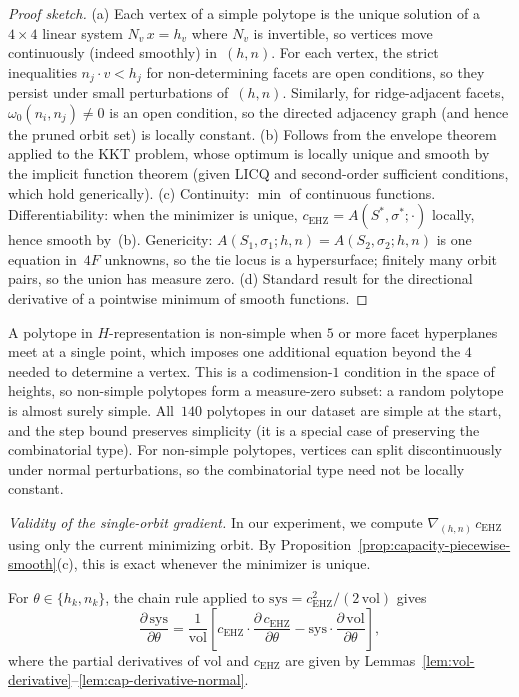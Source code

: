 \begin{proof}[Proof sketch]
(a) Each vertex of a simple polytope is the unique solution of a $4 \times 4$
linear system $N_v\,x = h_v$ where $N_v$ is invertible, so vertices move
continuously (indeed smoothly) in~$(h,n)$.
For each vertex, the strict inequalities
$n_j \cdot v < h_j$ for non-determining facets are open conditions, so they
persist under small perturbations of~$(h,n)$.
Similarly, for ridge-adjacent facets, $\omega_0(n_i, n_j) \neq 0$ is an open
condition, so the directed adjacency graph (and hence the pruned orbit set)
is locally constant.
(b) Follows from the envelope theorem applied to the KKT problem, whose
optimum is locally unique and smooth by the implicit function theorem
(given LICQ and second-order sufficient conditions, which hold generically).
(c) Continuity: $\min$ of continuous functions.
Differentiability: when the minimizer is unique, $c_{\mathrm{EHZ}} =
A(S^*,\sigma^*;\cdot)$ locally, hence smooth by~(b).
Genericity: $A(S_1,\sigma_1;h,n) = A(S_2,\sigma_2;h,n)$ is one equation in~$4F$
unknowns, so the tie locus is a hypersurface; finitely many orbit pairs, so
the union has measure zero.
(d) Standard result for the directional derivative of a pointwise minimum
of smooth functions.
\end{proof}

\begin{remark}
\label{rem:simplicity-generic}
A polytope in $H$-representation is non-simple when $5$ or more facet
hyperplanes meet at a single point, which imposes one additional equation
beyond the $4$ needed to determine a vertex.
This is a codimension-$1$ condition in the space of heights, so non-simple
polytopes form a measure-zero subset: a random polytope is almost surely simple.
All~$140$ polytopes in our dataset are simple at the start, and the step bound
preserves simplicity (it is a special case of preserving the combinatorial type).
For non-simple polytopes, vertices can split discontinuously under normal
perturbations, so the combinatorial type need not be locally constant.
\end{remark}

\emph{Validity of the single-orbit gradient.}
In our experiment, we compute $\nabla_{(h,n)}\,c_{\mathrm{EHZ}}$ using only
the current minimizing orbit. By Proposition~\ref{prop:capacity-piecewise-smooth}(c),
this is exact whenever the minimizer is unique.

\begin{corollary}
\label{cor:sys-derivative}
For $\theta \in \{h_k, n_k\}$, the chain rule applied to
$\mathrm{sys} = c_{\mathrm{EHZ}}^2 / (2\,\mathrm{vol})$ gives
\[
  \frac{\partial\,\mathrm{sys}}{\partial \theta}
  = \frac{1}{\mathrm{vol}}
    \left[
      c_{\mathrm{EHZ}} \cdot \frac{\partial\,c_{\mathrm{EHZ}}}{\partial \theta}
      - \mathrm{sys} \cdot \frac{\partial\,\mathrm{vol}}{\partial \theta}
    \right],
\]
where the partial derivatives of $\mathrm{vol}$ and $c_{\mathrm{EHZ}}$ are
given by Lemmas~\ref{lem:vol-derivative}--\ref{lem:cap-derivative-normal}.
\end{corollary}

